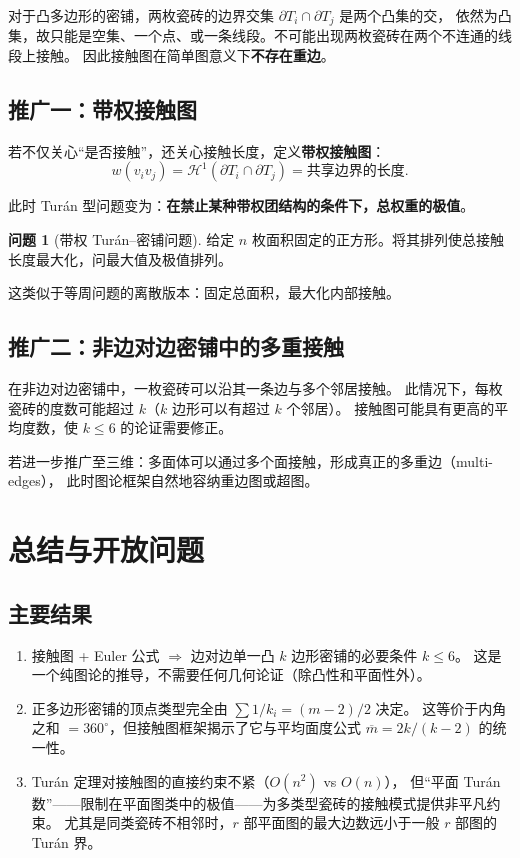 \documentclass[12pt,a4paper]{article}
\theoremstyle{plain}
\theoremstyle{definition}
\newtheorem{problem}[theorem]{问题}
\theoremstyle{remark}
\begin{document}
对于凸多边形的密铺，两枚瓷砖的边界交集 $\partial T_i \cap \partial T_j$ 是两个凸集的交，
依然为凸集，故只能是空集、一个点、或一条线段。不可能出现两枚瓷砖在两个不连通的线段上接触。
因此接触图在简单图意义下\textbf{不存在重边}。

\subsection{推广一：带权接触图}

若不仅关心``是否接触''，还关心接触长度，定义\textbf{带权接触图}：
\[
w(v_i v_j) = \mathcal{H}^1(\partial T_i \cap \partial T_j) = \text{共享边界的长度}.
\]

此时 Tur\'an 型问题变为：\textbf{在禁止某种带权团结构的条件下，总权重的极值}。

\begin{problem}[带权 Tur\'an--密铺问题]
给定 $n$ 枚面积固定的正方形。将其排列使总接触长度最大化，问最大值及极值排列。
\end{problem}

这类似于等周问题的离散版本：固定总面积，最大化内部接触。

\subsection{推广二：非边对边密铺中的多重接触}

在非边对边密铺中，一枚瓷砖可以沿其一条边与多个邻居接触。
此情况下，每枚瓷砖的度数可能超过 $k$（$k$ 边形可以有超过 $k$ 个邻居）。
接触图可能具有更高的平均度数，使 $k \le 6$ 的论证需要修正。

若进一步推广至三维：多面体可以通过多个面接触，形成真正的多重边（multi-edges），
此时图论框架自然地容纳重边图或超图。

\section{总结与开放问题}

\subsection{主要结果}

\begin{enumerate}[label=(\arabic*)]
    \item 接触图 + Euler 公式 $\Rightarrow$ 边对边单一凸 $k$ 边形密铺的必要条件 $k \le 6$。
    这是一个纯图论的推导，不需要任何几何论证（除凸性和平面性外）。
    
    \item 正多边形密铺的顶点类型完全由 $\sum 1/k_i = (m-2)/2$ 决定。
    这等价于内角之和 $= 360^\circ$，但接触图框架揭示了它与平均面度公式 $\overline{m} = 2k/(k-2)$ 的统一性。
    
    \item Tur\'an 定理对接触图的直接约束不紧（$O(n^2)$ vs $O(n)$），
    但``平面 Tur\'an 数''——限制在平面图类中的极值——为多类型瓷砖的接触模式提供非平凡约束。
    尤其是同类瓷砖不相邻时，$r$ 部平面图的最大边数远小于一般 $r$ 部图的 Tur\'an 界。
\end{enumerate}
\end{document}
